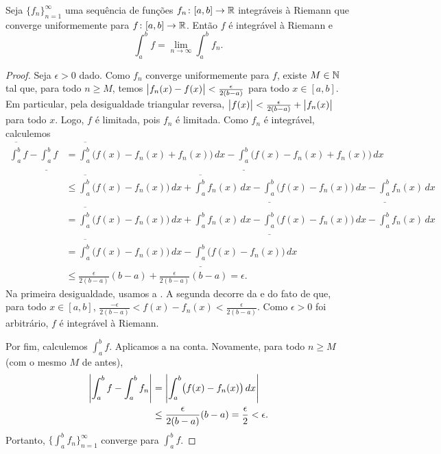 \begin{thm} \label{integralinterchange:thm}
Seja $\{ f_n \}_{n=1}^\infty$ uma sequência de funções
$f_n \colon [a,b] \to {\mathbb{R}}$ integráveis à Riemann que converge
uniformemente para $f \colon [a,b] \to {\mathbb{R}}$. Então $f$ é integrável à
Riemann e
\begin{equation*}
\int_a^b f = \lim_{n\to\infty} \int_a^b f_n .
\end{equation*}
\end{thm}

\begin{proof}
Seja $\epsilon > 0$ dado.
Como $f_n$ converge uniformemente para $f$, existe $M \in {\mathbb{N}}$ tal que,
para todo $n \geq M$, temos
$\bigl\lvert {f_n(x)-f(x)} \bigr\rvert < \frac{\epsilon}{2(b-a)}$ para todo $x \in [a,b]$.
Em particular, pela desigualdade triangular reversa,
$\bigl\lvert {f(x)} \bigr\rvert < \frac{\epsilon}{2(b-a)} + \bigl\lvert {f_n(x)} \bigr\rvert$ para todo $x$.
Logo, $f$ é limitada, pois $f_n$ é limitada.
Como $f_n$ é integrável, calculemos
\begin{equation*}
\begin{split}
\overline{\int_a^b} f
-
\underline{\int_a^b} f
& =
\overline{\int_a^b} \bigl( f(x) - f_n(x) + f_n(x) \bigr)\,dx
-
\underline{\int_a^b} \bigl( f(x) - f_n(x) + f_n(x) \bigr)\,dx
\\
& \leq
\overline{\int_a^b} \bigl( f(x) - f_n(x) \bigr)\,dx +  \overline{\int_a^b} f_n(x) \,dx
-
\underline{\int_a^b} \bigl( f(x) - f_n(x) \bigr)\,dx -  \underline{\int_a^b} f_n(x) \,dx
\\
& =
\overline{\int_a^b} \bigl( f(x) - f_n(x) \bigr)\,dx +  \int_a^b f_n(x) \,dx
-
\underline{\int_a^b} \bigl( f(x) - f_n(x) \bigr)\,dx -  \int_a^b f_n(x) \,dx
\\
& =
\overline{\int_a^b} \bigl( f(x) - f_n(x) \bigr)\,dx
-
\underline{\int_a^b} \bigl( f(x) - f_n(x) \bigr)\,dx
\\
& \leq
\frac{\epsilon}{2(b-a)} (b-a) + 
\frac{\epsilon}{2(b-a)} (b-a) = \epsilon .
\end{split}
\end{equation*}
Na primeira desigualdade, usamos a .
A segunda decorre da  e do fato de que, para
todo $x \in [a,b]$,
$\frac{-\epsilon}{2(b-a)} < f(x)-f_n(x) < \frac{\epsilon}{2(b-a)}$.
Como $\epsilon > 0$ foi arbitrário, $f$ é integrável à Riemann.

Por fim, calculemos $\int_a^b f$. Aplicamos a 
na conta. Novamente, para todo $n \geq M$ (com o mesmo $M$ de antes),
\begin{equation*}
\begin{split}
\left\lvert {\int_a^b f - \int_a^b f_n} \right\rvert & = 
\left\lvert { \int_a^b \bigl(f(x) - f_n(x)\bigr)\,dx} \right\rvert
\\
& \leq
\frac{\epsilon}{2(b-a)} (b-a) = \frac{\epsilon}{2} < \epsilon .
\end{split}
\end{equation*}
Portanto, $\bigl\{ \int_a^b f_n \bigr\}_{n=1}^\infty$ converge para
$\int_a^b f$.
\end{proof}

